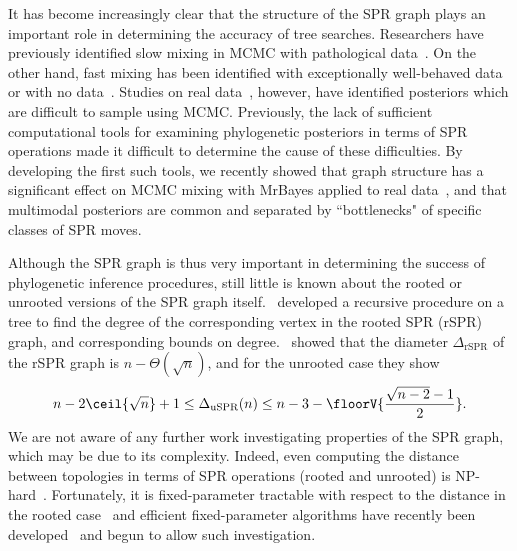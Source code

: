\documentclass[11pt]{amsart}
\begin{document}
It has become increasingly clear that the structure of the SPR graph plays an important role in determining the accuracy of tree searches.
Researchers have previously identified slow mixing in MCMC with pathological data~\cite{Mossel2005-ly,Mossel2006-fo,Ronquist2006-fv}.
On the other hand, fast mixing has been identified with exceptionally well-behaved data~\cite{Stefankovic2011-hu} or with no data~\cite{spade2014note}.
Studies on real data~\cite{beiko2006searching, lakner2008efficiency}, however, have identified posteriors which are difficult to sample using MCMC.
Previously, the lack of sufficient computational tools for examining phylogenetic posteriors in terms of SPR operations made it difficult to determine the cause of these difficulties.
By developing the first such tools, we recently showed that graph structure has a significant effect on MCMC mixing with MrBayes applied to real data~\cite{Whidden2015-yi}, and that multimodal posteriors are common and separated by ``bottlenecks" of specific classes of SPR moves.

Although the SPR graph is thus very important in determining the success of phylogenetic inference procedures, still little is known about the rooted or unrooted versions of the SPR graph itself.
\cite{Song2003-gf}~developed a recursive procedure on a tree to find the degree of the corresponding vertex in the rooted SPR (rSPR) graph, and corresponding bounds on degree.
\cite{Ding2011-bj}~showed that the diameter $\Delta_{\text{rSPR}}$ of the rSPR graph is $n - \Theta(\sqrt n)$, and for the unrooted case they show
$$ n - 2\ceil{\sqrt{n}} + 1
\le \Delta_{\text{uSPR}}(n)
\le n - 3 - \floorV{\frac{\sqrt{n - 2} - 1}{2}}.
$$
We are not aware of any further work investigating properties of the SPR graph, which may be due to its complexity.
Indeed, even computing the distance between topologies in terms of SPR operations (rooted and unrooted) is NP-hard~\cite{bordewich05,hickey2008sdc}.
Fortunately, it is fixed-parameter tractable with respect to the distance in the rooted case~\cite{bordewich05} and efficient fixed-parameter algorithms have recently been developed~\cite{whidden2013hybridization,Whidden2015-yi} and begun to allow such investigation.
\end{document}
